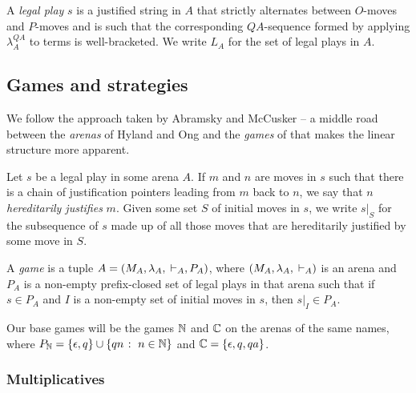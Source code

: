 \documentclass[sigplan,10pt,review]{acmart}\settopmatter{printfolios=true,printccs=false,printacmref=false}
\begin{document}
A \emph{legal play} $s$ is a justified string in $A$ that strictly alternates between $O$-moves and $P$-moves and is such that the corresponding $QA$-sequence formed by applying $\lambda_A^{QA}$ to terms is well-bracketed.
We write $L_A$ for the set of legal plays in $A$.

\subsection{Games and strategies}

We follow the approach taken by Abramsky and McCusker \cite{SamsonGuyIAPassive} -- a middle road between the \emph{arenas} of Hyland and Ong and the \emph{games} of \cite{ajmPcf} that makes the linear structure more apparent.

Let $s$ be a legal play in some arena $A$.  
If $m$ and $n$ are moves in $s$ such that there is a chain of justification pointers leading from $m$ back to $n$, we say that $n$ \emph{hereditarily justifies} $m$.  
Given some set $S$ of initial moves in $s$, we write $s\vert_S$ for the subsequence of $s$ made up of all those moves that are hereditarily justified by some move in $S$.

A \emph{game} is a tuple $A=(M_A,\lambda_A,{\;\vdash}_A,P_A)$, where $(M_A,\lambda_A,{\;\vdash}_A)$ is an arena and $P_A$ is a non-empty prefix-closed set of legal plays in that arena such that if $s\in P_A$ and $I$ is a non-empty set of initial moves in $s$, then $s\vert_I\in P_A$.

Our base games will be the games $\mathbb{N}$ and $\mathbb{C}$ on the arenas of the same names, where $P_{\mathbb{N}}=\{\epsilon,q\}\cup\{qn\;\colon\; n\in\mathbb{N}\}$ and $\mathbb{C} = \{\epsilon,q,qa\}$.  

\subsubsection{Multiplicatives}
\end{document}
